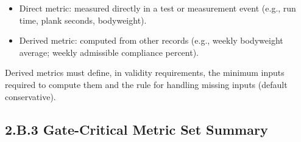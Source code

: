 \documentclass[10pt]{article}
\begin{document}
\begin{itemize}
\item Direct metric: measured directly in a test or measurement event (e.g., run time, plank seconds, bodyweight).
\item Derived metric: computed from other records (e.g., weekly bodyweight average; weekly admissible compliance percent).
\end{itemize}

Derived metrics must define, in validity requirements, the minimum inputs required to compute them and the rule for handling missing inputs (default conservative).

\newpage

\subsection*{2.B.3 Gate-Critical Metric Set Summary}
{}

\begingroup
\scriptsize
\setlength{\tabcolsep}{2pt}
\renewcommand{\arraystretch}{1.12}
\end{document}
